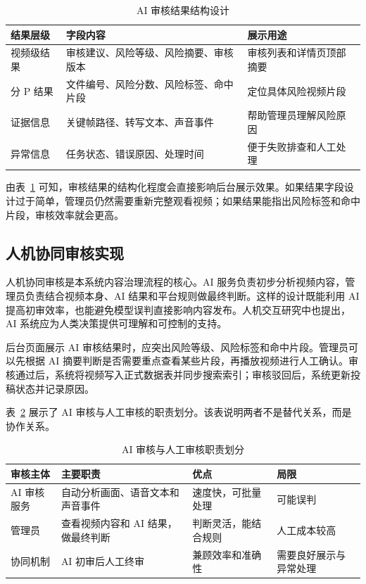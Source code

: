 \begin{table}[htbp]
  \centering
  \caption{AI 审核结果结构设计}
  \label{tab:audit-result-structure}
  \begin{tabular}{p{}p{}p{}}
    \hline
    \textbf{结果层级} & \textbf{字段内容} & \textbf{展示用途} \\
    \hline
    视频级结果 & 审核建议、风险等级、风险摘要、审核版本 & 审核列表和详情页顶部摘要 \\
    分 P 结果 & 文件编号、风险分数、风险标签、命中片段 & 定位具体风险视频片段 \\
    证据信息 & 关键帧路径、转写文本、声音事件 & 帮助管理员理解风险原因 \\
    异常信息 & 任务状态、错误原因、处理时间 & 便于失败排查和人工处理 \\
    \hline
  \end{tabular}
\end{table}

由表~\ref{tab:audit-result-structure} 可知，审核结果的结构化程度会直接影响后台展示效果。如果结果字段设计过于简单，管理员仍然需要重新完整观看视频；如果结果能指出风险标签和命中片段，审核效率就会更高。

\subsection{人机协同审核实现}
\label{subsec:human-ai-audit-implementation}

人机协同审核是本系统内容治理流程的核心。AI 服务负责初步分析视频内容，管理员负责结合视频本身、AI 结果和平台规则做最终判断。这样的设计既能利用 AI 提高初审效率，也能避免模型误判直接影响内容发布。人机交互研究中也提出，AI 系统应为人类决策提供可理解和可控制的支持\cite{amershi2019guidelines}。

后台页面展示 AI 审核结果时，应突出风险等级、风险标签和命中片段。管理员可以先根据 AI 摘要判断是否需要重点查看某些片段，再播放视频进行人工确认。审核通过后，系统将视频写入正式数据表并同步搜索索引；审核驳回后，系统更新投稿状态并记录原因。

表~\ref{tab:ai-human-responsibility} 展示了 AI 审核与人工审核的职责划分。该表说明两者不是替代关系，而是协作关系。

\begin{table}[htbp]
  \centering
  \caption{AI 审核与人工审核职责划分}
  \label{tab:ai-human-responsibility}
  \begin{tabular}{p{}p{}p{}p{}}
    \hline
    \textbf{审核主体} & \textbf{主要职责} & \textbf{优点} & \textbf{局限} \\
    \hline
    AI 审核服务 & 自动分析画面、语音文本和声音事件 & 速度快，可批量处理 & 可能误判 \\
    管理员 & 查看视频内容和 AI 结果，做最终判断 & 判断灵活，能结合规则 & 人工成本较高 \\
    协同机制 & AI 初审后人工终审 & 兼顾效率和准确性 & 需要良好展示与异常处理 \\
    \hline
  \end{tabular}
\end{table}

